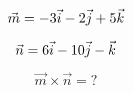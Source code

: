 \documentclass[10pt, a5paper]{article}
\begin{document}
	$$
		\vec{m} = -3 \vec{i} -2 \vec{j} + 5 \vec{k} \\
	$$
	
	$$
		\vec{n} = 6 \vec{i} -10 \vec{j} - \vec{k} \\
	$$
	
	$$
		\vec{m} \times \vec{n} = ?
	$$
\end{document}
